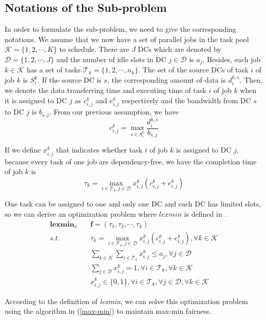 \subsection{Notations of the Sub-problem}
\label{sub-problem}
In order to formulate the sub-problem, we need to give the corresponding notations. We assume that we now have a set of parallel jobs in the task pool $\mathcal{K} = \{1,2,\cdots,K\}$ to schedule. There are $J$ DCs which are denoted by $\mathcal{D} = \{1,2,\cdots,J\}$ and the number of idle slots in DC $j\in\mathcal{D}$ is $a_j$. Besides, each job $k\in\mathcal{K}$ has a set of tasks $\mathcal{T}_k = \{1,2,\cdots,n_k\}$. The set of the source DCs of task $i$ of job $k$ is $S_i^k$. If the source DC is $s$, the corresponding amount of data is $d_i^{k,s}$. Then, we denote the data transferring time and executing time of task $i$ of job $k$ when it is assigned to DC $j$ as $c_{i,j}^k$ and $e_{i,j}^k$ respectively and the bandwidth from DC $s$ to DC $j$ is $b_{s,j}$. From our previous assumption, we have
\begin{equation}
    c_{i,j}^k = \max_{s\in S^k_i} \frac{d_{i}^{k,s}}{b_{s,j}}
\end{equation}

If we define $x_{i,j}^k$ that indicates whether task $i$ of job $k$ is assigned to DC $j$, because every task of one job are dependency-free, we have the completion time of job $k$ is
\begin{equation}
    \tau_k = \max_{i\in\mathcal{T}_k,j\in \mathcal{D}} x_{i,j}^k(c_{i,j}^k+e_{i,j}^k)
\end{equation}

One task can be assigned to one and only one DC and each DC has limited slots, so we can derive an optimization problem where $lexmin$ is defined in \cite{LP-paper}.
\begin{align}
    \textbf{lexmin}_{x} \quad& \mathbf{f} = (\tau_1,\tau_2,\cdots,\tau_k)\\
    s.t. \quad & \tau_k = \max_{i\in\mathcal{T}_k,j\in \mathcal{D}} x_{i,j}^k(c_{i,j}^k+e_{i,j}^k),\forall k\in\mathcal{K}\\
    &\sum_{k\in\mathcal{K}}\sum_{i\in\mathcal{T}_k} x_{i,j}^k\le a_j, \forall j \in \mathcal{D}\\
    &\sum_{j\in\mathcal{D}}x_{i,j}^k = 1,\forall i \in\mathcal{T}_k,\forall k\in\mathcal{K}\\
    & x_{i,j}^k \in \{0,1\}, \forall i \in \mathcal{T}_k,\forall{j}\in\mathcal{D},\forall k \in \mathcal{K}
\end{align}

According to the definition of \emph{lexmin}, we can solve this optimization problem using the algorithm in (\ref{max-min}) to maintain max-min fairness.
